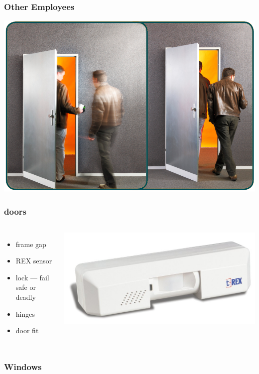\documentclass[]{beamer}
\begin{document}
\begin{frame}
  \frametitle{Other Employees}
  \includegraphics[width=.9\textwidth]{tailgating}
\end{frame}

\begin{frame}
  \frametitle{doors}
  \begin{columns}[c]
  \begin{itemize}
    \item frame gap
    \item REX sensor
    \item lock --- fail safe or deadly
    \item hinges
    \item door fit
  \end{itemize}
  \includegraphics{T-REX}
\end{columns}
\end{frame}

\begin{frame}
  \frametitle{Windows}
\end{frame}
\end{document}
